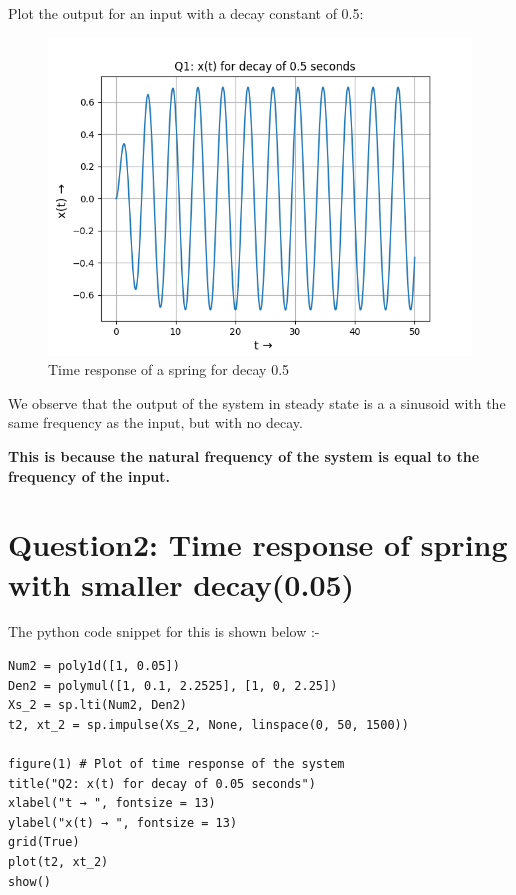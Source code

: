 \documentclass[11pt, a4paper]{article}
\begin{document}
Plot the output for an input with a decay constant of 0.5:

\begin{figure}[!tbh]
 \centering
 \includegraphics[scale=0.6]{Ass6_Figure_0.png}  
 \caption{Time response of a spring for decay 0.5}
\end{figure}

We observe that the output of the system in steady state is a a sinusoid with the same frequency as the input, but with no decay. 

{\textbf{This is because the natural frequency of the system is equal to the frequency of the input.}} 

  \section{Question2: Time response of spring with smaller decay(0.05)}
  The python code snippet for this is shown below :-
\begin{verbatim}
Num2 = poly1d([1, 0.05])                  
Den2 = polymul([1, 0.1, 2.2525], [1, 0, 2.25]) 
Xs_2 = sp.lti(Num2, Den2)
t2, xt_2 = sp.impulse(Xs_2, None, linspace(0, 50, 1500)) 

figure(1) # Plot of time response of the system
title("Q2: x(t) for decay of 0.05 seconds") 
xlabel("t → ", fontsize = 13)
ylabel("x(t) → ", fontsize = 13)
grid(True) 
plot(t2, xt_2)
show() 
\end{verbatim}
\end{document}
